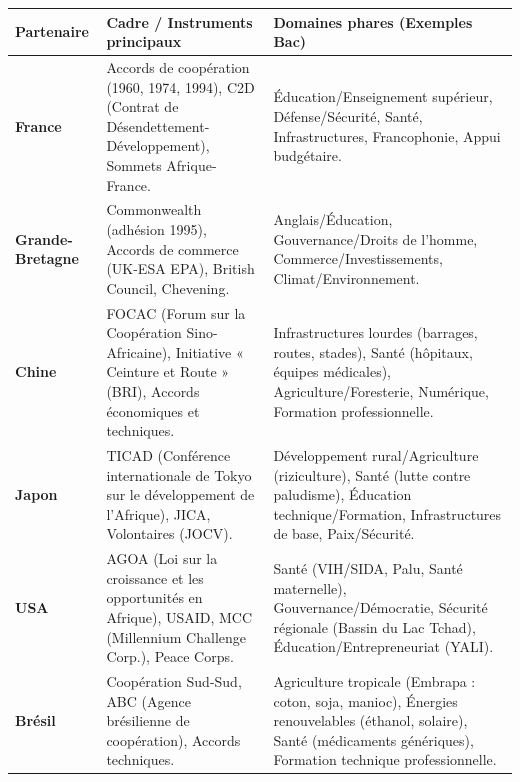 \documentclass[11pt]{article}
\begin{document}
\begin{bilan}
\begin{center}
\begin{tabularx}{\linewidth}{|l|X|X|}\hline
\rowcolor{popblueL}
\textbf{Partenaire} & \textbf{Cadre / Instruments principaux} & \textbf{Domaines phares (Exemples Bac)} \\ \hline
\textbf{France} & Accords de coopération (1960, 1974, 1994), C2D (Contrat de Désendettement-Développement), Sommets Afrique-France. & Éducation/Enseignement supérieur, Défense/Sécurité, Santé, Infrastructures, Francophonie, Appui budgétaire. \\ \hline
\textbf{Grande-Bretagne} & Commonwealth (adhésion 1995), Accords de commerce (UK-ESA EPA), British Council, Chevening. & Anglais/Éducation, Gouvernance/Droits de l'homme, Commerce/Investissements, Climat/Environnement. \\ \hline
\textbf{Chine} & FOCAC (Forum sur la Coopération Sino-Africaine), Initiative « Ceinture et Route » (BRI), Accords économiques et techniques. & Infrastructures lourdes (barrages, routes, stades), Santé (hôpitaux, équipes médicales), Agriculture/Foresterie, Numérique, Formation professionnelle. \\ \hline
\textbf{Japon} & TICAD (Conférence internationale de Tokyo sur le développement de l'Afrique), JICA, Volontaires (JOCV). & Développement rural/Agriculture (riziculture), Santé (lutte contre paludisme), Éducation technique/Formation, Infrastructures de base, Paix/Sécurité. \\ \hline
\textbf{USA} & AGOA (Loi sur la croissance et les opportunités en Afrique), USAID, MCC (Millennium Challenge Corp.), Peace Corps. & Santé (VIH/SIDA, Palu, Santé maternelle), Gouvernance/Démocratie, Sécurité régionale (Bassin du Lac Tchad), Éducation/Entrepreneuriat (YALI). \\ \hline
\textbf{Brésil} & Coopération Sud-Sud, ABC (Agence brésilienne de coopération), Accords techniques. & Agriculture tropicale (Embrapa : coton, soja, manioc), Énergies renouvelables (éthanol, solaire), Santé (médicaments génériques), Formation technique professionnelle. \\ \hline
\end{tabularx}
\end{center}


\end{bilan}
\end{document}
